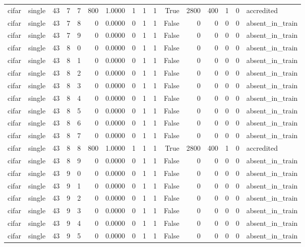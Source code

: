 \begin{tabular}{llrrrrrrrrrrrrrl}
cifar & single & 43 & 7 & 7 & 800 & 1.0000 & 1 & 1 & 1 & True & 2800 & 400 & 1 & 0 & accredited \\
cifar & single & 43 & 7 & 8 & 0 & 0.0000 & 0 & 1 & 1 & False & 0 & 0 & 0 & 0 & absent\_in\_train \\
cifar & single & 43 & 7 & 9 & 0 & 0.0000 & 0 & 1 & 1 & False & 0 & 0 & 0 & 0 & absent\_in\_train \\
cifar & single & 43 & 8 & 0 & 0 & 0.0000 & 0 & 1 & 1 & False & 0 & 0 & 0 & 0 & absent\_in\_train \\
cifar & single & 43 & 8 & 1 & 0 & 0.0000 & 0 & 1 & 1 & False & 0 & 0 & 0 & 0 & absent\_in\_train \\
cifar & single & 43 & 8 & 2 & 0 & 0.0000 & 0 & 1 & 1 & False & 0 & 0 & 0 & 0 & absent\_in\_train \\
cifar & single & 43 & 8 & 3 & 0 & 0.0000 & 0 & 1 & 1 & False & 0 & 0 & 0 & 0 & absent\_in\_train \\
cifar & single & 43 & 8 & 4 & 0 & 0.0000 & 0 & 1 & 1 & False & 0 & 0 & 0 & 0 & absent\_in\_train \\
cifar & single & 43 & 8 & 5 & 0 & 0.0000 & 0 & 1 & 1 & False & 0 & 0 & 0 & 0 & absent\_in\_train \\
cifar & single & 43 & 8 & 6 & 0 & 0.0000 & 0 & 1 & 1 & False & 0 & 0 & 0 & 0 & absent\_in\_train \\
cifar & single & 43 & 8 & 7 & 0 & 0.0000 & 0 & 1 & 1 & False & 0 & 0 & 0 & 0 & absent\_in\_train \\
cifar & single & 43 & 8 & 8 & 800 & 1.0000 & 1 & 1 & 1 & True & 2800 & 400 & 1 & 0 & accredited \\
cifar & single & 43 & 8 & 9 & 0 & 0.0000 & 0 & 1 & 1 & False & 0 & 0 & 0 & 0 & absent\_in\_train \\
cifar & single & 43 & 9 & 0 & 0 & 0.0000 & 0 & 1 & 1 & False & 0 & 0 & 0 & 0 & absent\_in\_train \\
cifar & single & 43 & 9 & 1 & 0 & 0.0000 & 0 & 1 & 1 & False & 0 & 0 & 0 & 0 & absent\_in\_train \\
cifar & single & 43 & 9 & 2 & 0 & 0.0000 & 0 & 1 & 1 & False & 0 & 0 & 0 & 0 & absent\_in\_train \\
cifar & single & 43 & 9 & 3 & 0 & 0.0000 & 0 & 1 & 1 & False & 0 & 0 & 0 & 0 & absent\_in\_train \\
cifar & single & 43 & 9 & 4 & 0 & 0.0000 & 0 & 1 & 1 & False & 0 & 0 & 0 & 0 & absent\_in\_train \\
cifar & single & 43 & 9 & 5 & 0 & 0.0000 & 0 & 1 & 1 & False & 0 & 0 & 0 & 0 & absent\_in\_train \\

\end{tabular}
